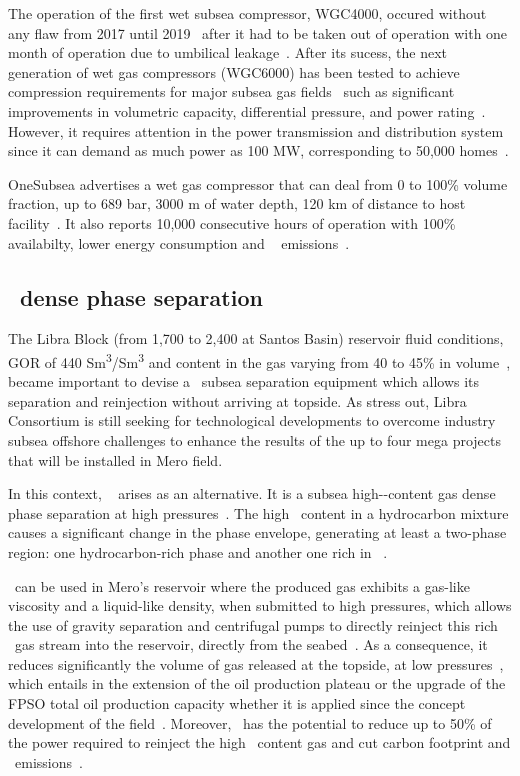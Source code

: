 The operation of the first wet subsea compressor, WGC4000, occured without any flaw from 2017 until 2019~\citep{Floisand2019} after it had to be taken out of operation with one month of operation due to umbilical leakage~\citep{Boe2018}.  After its sucess, the next generation of wet gas compressors (WGC6000) has been tested to achieve compression requirements for major subsea gas fields~\citep{Floisand2019} such as significant improvements in volumetric capacity, differential pressure, and power rating~\citep{Floisand2019}. However, it requires attention in the power transmission and distribution system since it can demand as much power as 100 MW, corresponding to 50,000 homes~\citep{Floisand2019}.  

OneSubsea advertises a wet gas compressor that can deal from 0 to 100\% volume fraction, up to 689 bar, 3000 m of water depth, 120 km of distance to host facility~\citep{OneSubseaWetCompressor}. It also reports 10,000 consecutive hours of operation with 100\% availabilty, lower energy consumption and \CO~ emissions~\citep{OneSubseaWetCompressor}.  

\subsection{\CO~dense phase separation}
\label{sec:DensePhaseSeparation}
The Libra Block (from 1,700 to 2,400 at Santos Basin) reservoir fluid conditions, GOR of 440 Sm\textsuperscript{3}/Sm\textsuperscript{3} and \CO content in the gas varying from 40 to 45\% in volume~\citep{Melo2019}, became important to devise a \CO~subsea separation equipment which allows its separation and reinjection without arriving at topside. As \citet{Melo2019} stress out, Libra Consortium is still seeking for technological developments to overcome industry subsea offshore challenges to enhance the results of the up to four mega projects that will be installed in Mero field.

In this context, \HiSep~\citep{Passarelli2017} arises as an alternative. It is a subsea high-\CO-content gas dense phase separation at high pressures~\citep{Melo2019, Passarelli2019}. The high \CO~content in a hydrocarbon mixture causes a significant change in the phase envelope, generating at least a two-phase region: one hydrocarbon-rich phase and another one rich in \CO~\citep{Passarelli2019}.

\HiSep~can be used in Mero's reservoir where the produced gas exhibits a gas-like viscosity and a liquid-like density, when submitted to high pressures, which allows the use of gravity
separation and centrifugal pumps to directly reinject this rich \CO~gas stream into the reservoir, directly from the seabed~\citep{Melo2019}. As a consequence, it reduces significantly the volume of gas released at the topside, at low pressures~\citep{Melo2019}, which entails in the extension of the oil production plateau or the upgrade of the FPSO total oil production capacity whether it is applied since the concept development of the field~\citep{Melo2019}. Moreover, \HiSep~has the potential to reduce up to 50\% of the power required to reinject the high \CO~content gas and cut carbon footprint and \CO~emissions~\citep{Melo2019}.

